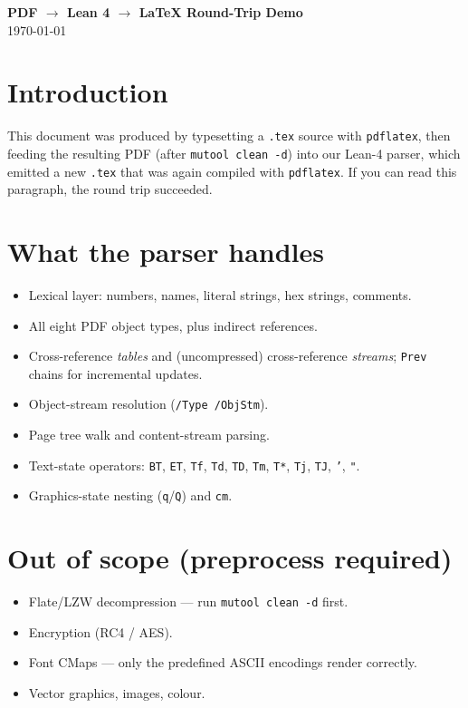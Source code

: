 \documentclass[12pt]{article}
\begin{document}
\begin{center}
{\Large\bfseries PDF $\to$ Lean 4 $\to$ \LaTeX{} Round-Trip Demo}\\[1ex]
{\small \today}
\end{center}

\section{Introduction}

This document was produced by typesetting a \texttt{.tex} source with \texttt{pdflatex},
then feeding the resulting PDF (after \texttt{mutool clean -d}) into our
Lean-4 parser, which emitted a new \texttt{.tex} that was again compiled
with \texttt{pdflatex}.  If you can read this paragraph, the round trip
succeeded.

\section{What the parser handles}

\begin{itemize}
\item Lexical layer: numbers, names, literal strings, hex strings, comments.
\item All eight PDF object types, plus indirect references.
\item Cross-reference \emph{tables} and (uncompressed) cross-reference
      \emph{streams}; \texttt{Prev} chains for incremental updates.
\item Object-stream resolution (\texttt{/Type /ObjStm}).
\item Page tree walk and content-stream parsing.
\item Text-state operators: \texttt{BT}, \texttt{ET}, \texttt{Tf},
      \texttt{Td}, \texttt{TD}, \texttt{Tm}, \texttt{T*}, \texttt{Tj},
      \texttt{TJ}, \texttt{'}, \texttt{"}.
\item Graphics-state nesting (\texttt{q}/\texttt{Q}) and \texttt{cm}.
\end{itemize}

\section{Out of scope (preprocess required)}

\begin{itemize}
\item Flate/LZW decompression --- run \texttt{mutool clean -d} first.
\item Encryption (RC4 / AES).
\item Font CMaps --- only the predefined ASCII encodings render correctly.
\item Vector graphics, images, colour.
\end{itemize}
\end{document}
